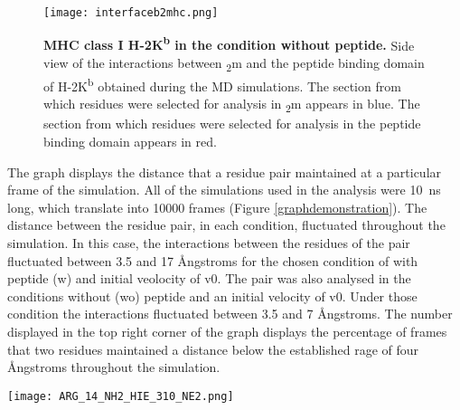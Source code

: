 \documentclass[11pt,twocolumn]{article}
\def\plus{\texttt{+}}
\newcommand{\kb}{H-2K\textsuperscript{b}\xspace}
\newcommand{\angstr}{{\AA}ngstroms\xspace}
\newcommand{\btm}{\textbeta\textsubscript{2}m\xspace}
\begin{document}
\begin{figure}
\texttt{[image: interfaceb2mhc.png]}
\caption{\textbf{MHC class I \kb in the condition without peptide.} Side view
of the interactions between \btm and the peptide binding domain of \kb obtained
during the MD simulations. The section from which residues were selected for
analysis in \btm appears in blue. The section from which residues were selected
for analysis in the peptide binding domain appears in red.}
\label{interface}
\end{figure}

The graph displays the distance that a residue pair maintained at a particular
frame of the simulation. All of the simulations used in the analysis were
\SI{10}{\nano\second} long, which translate into 10000 frames (Figure
\ref{graphdemonstration}). The distance between the residue pair, in each
condition, fluctuated throughout the simulation. In this case, the interactions
between the residues of the pair fluctuated between 3.5  and  17 \angstr for
the chosen condition of with peptide (w) and initial veolocity of v0. The pair
was also analysed in the conditions without (wo) peptide and an initial
velocity of v0. Under those condition the interactions   fluctuated between 3.5
and  7 \angstr.  The number displayed in the top right corner of the graph
displays the percentage of frames that two residues maintained a distance
below the established rage of four \angstr throughout the simulation. 

\begin{figure*}
\begin{center}
\texttt{[image: ARG\_14\_NH2\_HIE\_310\_NE2.png]}
\caption{\textbf{Example of a graph generated by \texttt{gnuplot} after
processing the first line in the residue pair file (Listing \ref{resatexample})
with the two scripts (Listing \ref{Tcl.script} and \ref{generategnuplot.sh}).}
The distance between the two interacting atoms for each of the two residue
pairs represented in every frame of the simulation as $\plus$ or a $\times$.
One pair was analysed in the conditions with peptide and initial velocity of
v0. The other pair was analysed in the conditions without peptide and initial
velocity of v0. The percentage calculated in Listing \ref{generategnuplot.sh}
is displayed in the top right corner and the name of the analysed pair can be
seen on the top of the graph. The blue line indicates the 4 \angstr cutoff
value.}
\label{graphdemonstration}
\end{center}
\end{figure*}
\end{document}
